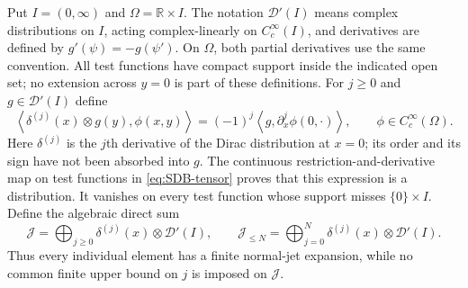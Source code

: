 Put $I=(0,\infty)$ and $\Omega=\mathbb R\times I$.
The notation $\mathcal D'(I)$ means complex distributions on $I$,
acting complex-linearly on $C_c^\infty(I)$, and derivatives are defined
by $g'(\psi)=-g(\psi')$. On $\Omega$, both partial derivatives use
the same convention. All test functions have compact support inside
the indicated open set; no extension across $y=0$ is part of these
definitions.
For $j\geq0$ and $g\in\mathcal D'(I)$ define
\begin{equation}\tag{SDB3}\label{eq:SDB-tensor}
 \left\langle\delta^{(j)}(x)\otimes g(y),\phi(x,y)\right\rangle
 =(-1)^j\left\langle g,
             \partial_x^j\phi(0,\cdot)\right\rangle,
 \qquad\phi\in C_c^\infty(\Omega).
\end{equation}
Here $\delta^{(j)}$ is the $j$th derivative of the Dirac distribution
at $x=0$; its order and its sign have not been absorbed into $g$.
The continuous restriction-and-derivative map on test functions in
\eqref{eq:SDB-tensor} proves that this expression is a distribution.
It vanishes on every test function whose support misses $\{0\}\times I$.
Define the algebraic direct sum
\begin{equation}\tag{SDB4}\label{eq:SDB-J}
 \mathcal J=
 \bigoplus_{j\geq0}\delta^{(j)}(x)\otimes\mathcal D'(I),
 \qquad
 \mathcal J_{\leq N}=
 \bigoplus_{j=0}^N\delta^{(j)}(x)\otimes\mathcal D'(I).
\end{equation}
Thus every individual element has a finite normal-jet expansion, while
no common finite upper bound on $j$ is imposed on $\mathcal J$.

